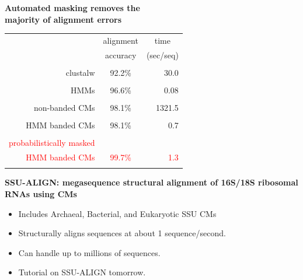 \documentclass[landscape]{slides}
\begin{document}
\begin{slide}
\begin{center}

\textbf{Automated masking removes the \\ majority of alignment errors}
\end{center}
\medskip
\medskip
\begin{center}

\begin{tabular}{rcr} 
& \multicolumn{1}{c}{alignment} & \multicolumn{1}{c}{time} \\
& \multicolumn{1}{c}{accuracy} & \multicolumn{1}{c}{(sec/seq)} \\ \hline
& \multicolumn{1}{c}{} & \multicolumn{1}{c}{} \\
clustalw & 92.2\% & 30.0 \\ 
& \multicolumn{1}{c}{} & \multicolumn{1}{c}{} \\
HMMs & 96.6\% & 0.08 \\ 
& \multicolumn{1}{c}{} & \multicolumn{1}{c}{} \\
non-banded CMs & 98.1\% & 1321.5 \\ 
& \multicolumn{1}{c}{} & \multicolumn{1}{c}{} \\
HMM banded CMs & 98.1\% & 0.7 \\ %
& \multicolumn{1}{c}{} & \multicolumn{1}{c}{} \\
\textcolor{red}{probabilistically masked} & & \\
\textcolor{red}{HMM banded CMs}           & \textcolor{red}{99.7\%} & \textcolor{red}{1.3} \\ %
& \multicolumn{1}{c}{} & \multicolumn{1}{c}{} \\
\end{tabular}
\end{center}


\vfill
\end{slide}
\begin{slide}
\begin{center}
\textbf{SSU-ALIGN: megasequence structural alignment of 16S/18S
    ribosomal RNAs using CMs}
\end{center}

\begin{itemize}
\item Includes Archaeal, Bacterial, and Eukaryotic SSU CMs
\item Structurally aligns sequences at about 1 sequence/second.
\item Can handle up to millions of sequences. 
\item Tutorial on SSU-ALIGN tomorrow.
\end{itemize}

\vfill
\end{slide}
\end{document}
